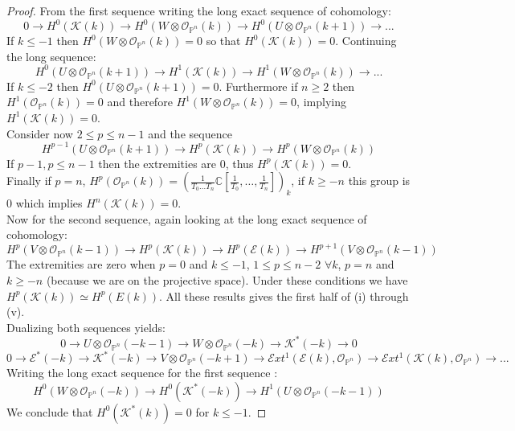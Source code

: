 \documentclass[
	oldfontcommands,
	sumario=abnt-6027-2012,
	12pt,			%
	openright,		%
	oneside,		%
	a4paper,		%
	english,		%
	brazil			%
	]{imecc-unicamp}
\begin{document}
\begin{proof}
From the first sequence writing the long exact sequence of cohomology:
\begin{equation}
0 \to H^0(\mathcal{K}(k)) \to H^0(W \otimes \mathcal{O}_{\mathbb{P}^n}(k)) \to H^0(U \otimes \mathcal{O}_{\mathbb{P}^n}(k+1)) \to ...
\end{equation}
If $k \leq -1$ then $H^0(W \otimes \mathcal{O}_{\mathbb{P}^n}(k))=0$ so that $H^0(\mathcal{K}(k))=0$.
Continuing the long sequence:
\begin{equation}
H^0(U \otimes \mathcal{O}_{\mathbb{P}^n}(k+1)) \to H^1(\mathcal{K}(k)) \to H^1(W \otimes \mathcal{O}_{\mathbb{P}^n}(k)) \to ...
\end{equation} 
If $k \leq -2$ then $H^0(U \otimes \mathcal{O}_{\mathbb{P}^n}(k+1))=0$. Furthermore if $n \geq 2$ then $H^1 (\mathcal{O}_{\mathbb{P}^n}(k))=0$ and therefore $H^1(W \otimes \mathcal{O}_{\mathbb{P}^n}(k))=0$, implying $H^1(\mathcal{K}(k))=0$. \\
Consider now $2 \leq p \leq n-1$ and the sequence
\begin{equation}
H^{p-1}(U \otimes \mathcal{O}_{\mathbb{P}^n}(k+1)) \to H^{p}(\mathcal{K}(k)) \to H^{p}(W \otimes \mathcal{O}_{\mathbb{P}^n}(k))
\end{equation}
If $p-1,p \leq n-1$ then the extremities are $0$, thus $H^p(\mathcal{K}(k))=0$. \\
Finally if $p=n$, $H^p(\mathcal{O}_{\mathbb{P}^n}(k))=(\frac{1}{T_0 \ldots T_n} \mathbb{C}[\frac{1}{T_0}, \ldots, \frac{1}{T_n}])_k$, if $k \geq -n$ this group is $0$ which implies $H^n(\mathcal{K}(k))=0$. \\
Now for the second sequence, again looking at the long exact sequence of cohomology:
\begin{equation}
H^{p}(V \otimes \mathcal{O}_{\mathbb{P}^n}(k-1)) \to H^{p}(\mathcal{K}(k)) \to H^{p}(\mathcal{E}(k)) \to H^{p+1}(V \otimes \mathcal{O}_{\mathbb{P}^n}(k-1))
\end{equation}
The extremities are zero when $p=0$ and $k \leq -1$, $1 \leq p \leq n-2$ $\forall k$, $p=n$ and $k \geq -n$ (because we are on the projective space). Under these conditions we have $H^{p}(\mathcal{K}(k)) \simeq H^{p}(E(k))$. 
All these results gives the first half of (i) through (v). \\
Dualizing both sequences yields:
\begin{equation}
0 \to U \otimes \mathcal{O}_{\mathbb{P}^n}(-k-1) \to W \otimes \mathcal{O}_{\mathbb{P}^n}(-k) \to \mathcal{K}^*(-k) \to 0
\end{equation}
\begin{equation}
0 \to \mathcal{E}^*(-k) \to \mathcal{K}^*(-k) \to V \otimes \mathcal{O}_{\mathbb{P}^n}(-k+1) \to \mathcal{E}xt^1(\mathcal{E}(k),\mathcal{O}_{\mathbb{P}^n}) \to \mathcal{E}xt^1(\mathcal{K}(k),\mathcal{O}_{\mathbb{P}^n}) \to ...
\end{equation}
Writing the long exact sequence for the first sequence :
\begin{equation}
H^0( W \otimes \mathcal{O}_{\mathbb{P}^n}(-k)) \to H^0(\mathcal{K}^*(-k)) \to H^1(U \otimes \mathcal{O}_{\mathbb{P}^n}(-k-1))
\end{equation}
We conclude that $H^0(\mathcal{K}^*(k))=0$ for $k \leq -1$.


\end{proof}
\end{document}
